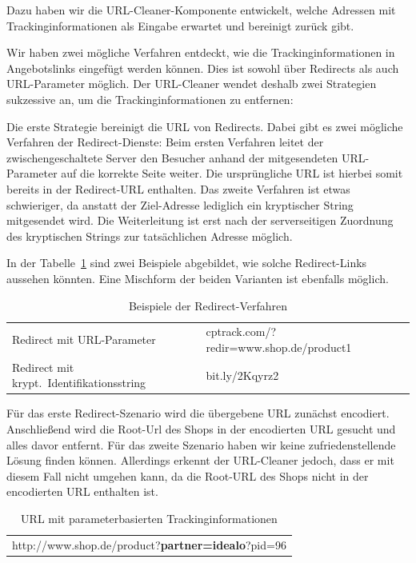 Dazu haben wir die URL-Cleaner-Komponente entwickelt, welche Adressen mit Trackinginformationen als Eingabe erwartet und
bereinigt zurück gibt.

Wir haben zwei mögliche Verfahren entdeckt, wie die Trackinginformationen in Angebotslinks eingefügt werden können.
Dies ist sowohl über Redirects als auch URL-Parameter möglich.
Der URL-Cleaner wendet deshalb zwei Strategien sukzessive an, um die Trackinginformationen zu entfernen:

Die erste Strategie bereinigt die URL von Redirects.
Dabei gibt es zwei mögliche Verfahren der Redirect-Dienste:
Beim ersten Verfahren leitet der zwischengeschaltete Server den Besucher anhand der mitgesendeten URL-Parameter auf
die korrekte Seite weiter.
Die ursprüngliche URL ist hierbei somit bereits in der Redirect-URL enthalten.
Das zweite Verfahren ist etwas schwieriger, da anstatt der Ziel-Adresse lediglich ein kryptischer String mitgesendet
wird.
Die Weiterleitung ist erst nach der serverseitigen Zuordnung des kryptischen Strings zur tatsächlichen Adresse möglich.

In der Tabelle~\ref{tab:redirect} sind zwei Beispiele abgebildet, wie solche Redirect-Links aussehen könnten.
Eine Mischform der beiden Varianten ist ebenfalls möglich.

\begin{table}[h]
    \centering
    \begin{tabular}{ l | l }
        Redirect mit URL-Parameter                  &   cptrack.com/?redir=www.shop.de/product1\\
        Redirect mit krypt.\ Identifikationsstring   &   bit.ly/2Kqyrz2
    \end{tabular}
    \caption{Beispiele der Redirect-Verfahren}
    \label{tab:redirect}
\end{table}

Für das erste Redirect-Szenario wird die übergebene URL zunächst encodiert.
Anschließend wird die Root-Url des Shops in der encodierten URL gesucht und alles davor entfernt.
Für das zweite Szenario haben wir keine zufriedenstellende Lösung finden können.
Allerdings erkennt der URL-Cleaner jedoch, dass er mit diesem Fall nicht umgehen kann, da die Root-URL des Shops
nicht in der encodierten URL enthalten ist.

\begin{table}[h]
    \centering
    \begin{tabular}{ c }
        http://www.shop.de/product?\textbf{partner=idealo}?pid=96
    \end{tabular}
    \caption{URL mit parameterbasierten Trackinginformationen}
    \label{tab:trackparameter}
\end{table}


